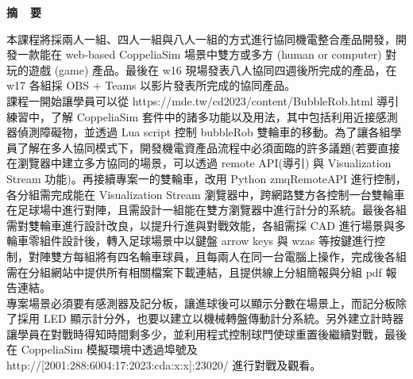 \renewcommand{\baselinestretch}{1.5} %
\clearpage  %
\sectionef
{} %
\begin{center}
\LARGE\textbf{摘~~要}\\
\end{center}
\begin{flushleft}
\fontsize{14pt}{20pt}\sectionef\hspace{12pt}\quad 本課程將採兩人一組、四人一組與八人一組的方式進行協同機電整合產品開發，開發一款能在 web-based CoppeliaSim 場景中雙方或多方 (human or computer) 對玩的遊戲 (game) 產品。最後在 w16 現場發表八人協同四週後所完成的產品，在 w17 各組採 OBS + Teams 以影片發表所完成的協同產品。\\[12pt]

\fontsize{14pt}{20pt}\sectionef\hspace{12pt}\quad 課程一開始讓學員可以從 https://mde.tw/cd2023/content/BubbleRob.html 導引練習中，了解 CoppeliaSim 套件中的諸多功能以及用法，其中包括利用近接感測器偵測障礙物，並透過 Lua script 控制 bubbleRob 雙輪車的移動。為了讓各組學員了解在多人協同模式下，開發機電資產品流程中必須面臨的許多議題(若要直接在瀏覽器中建立多方協同的場景，可以透過 remote API(導引) 與 Visualization Stream 功能)。再接續專案一的雙輪車，改用 Python zmqRemoteAPI 進行控制，各分組需完成能在 Visualization Stream 瀏覽器中，跨網路雙方各控制一台雙輪車在足球場中進行對陣，且需設計一組能在雙方瀏覽器中進行計分的系統。最後各組需對雙輪車進行設計改良，以提升行進與對戰效能，各組需採 CAD 進行場景與多輪車零組件設計後，轉入足球場景中以鍵盤 arrow keys 與 wzas 等按鍵進行控制，對陣雙方每組將有四名輪車球員，且每兩人在同一台電腦上操作，完成後各組需在分組網站中提供所有相關檔案下載連結，且提供線上分組簡報與分組 pdf 報告連結。\\[12pt]

\fontsize{14pt}{20pt}\sectionef\hspace{12pt}\quad 專案場景必須要有感測器及記分板，讓進球後可以顯示分數在場景上，而記分板除了採用 LED 顯示計分外，也要以建立以機械轉盤傳動計分系統。另外建立計時器讓學員在對戰時得知時間剩多少，並利用程式控制球門使球重置後繼續對戰，最後在
CoppeliaSim 模擬環境中透過埠號及 http://[2001:288:6004:17:2023:cda:x:x]:23020/ 進行對戰及觀看。\\[12pt]
\end{flushleft}
\newpage
\renewcommand{\baselinestretch}{1.5} %
